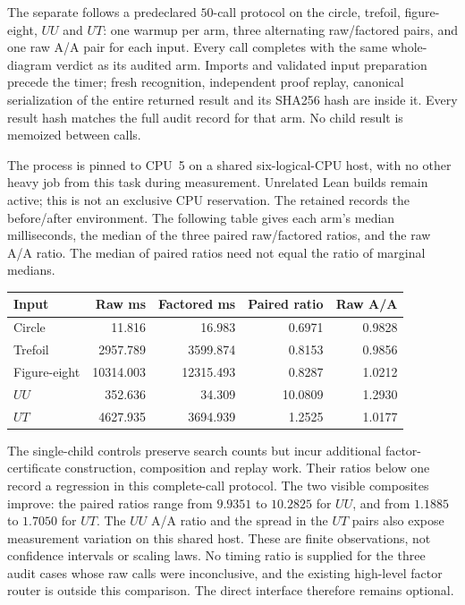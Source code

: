 The separate  follows a
predeclared $50$-call protocol on the circle, trefoil, figure-eight, $UU$
and $UT$: one warmup per arm, three alternating raw/factored pairs, and
one raw A/A pair for each input.  Every call completes with the same
whole-diagram verdict as its audited arm.  Imports and validated input
preparation precede the timer; fresh recognition, independent proof replay,
canonical serialization of the entire returned result and its SHA256 hash
are inside it.  Every result hash matches the full audit record for that
arm.  No child result is memoized between calls.

The process is pinned to CPU~5 on a shared six-logical-CPU host, with no
other heavy job from this task during measurement.  Unrelated Lean builds
remain active; this is not an exclusive CPU reservation.  The retained
 records the before/after
environment.  The following table gives each arm's median milliseconds,
the median of the three paired raw/factored ratios, and the raw A/A ratio.
The median of paired ratios need not equal the ratio of marginal medians.

\begin{center}\small
\begin{tabular}{lrrrr}
\toprule
Input & Raw ms & Factored ms & Paired ratio & Raw A/A\\
\midrule
Circle & 11.816 & 16.983 & 0.6971 & 0.9828\\
Trefoil & 2957.789 & 3599.874 & 0.8153 & 0.9856\\
Figure-eight & 10314.003 & 12315.493 & 0.8287 & 1.0212\\
$UU$ & 352.636 & 34.309 & 10.0809 & 1.2930\\
$UT$ & 4627.935 & 3694.939 & 1.2525 & 1.0177\\
\bottomrule
\end{tabular}
\end{center}

The single-child controls preserve search counts but incur additional
factor-certificate construction, composition and replay work.  Their
ratios below one record a regression in this complete-call protocol.
The two visible composites improve: the paired ratios range from
$9.9351$ to $10.2825$ for $UU$, and from $1.1885$ to $1.7050$ for $UT$.
The $UU$ A/A ratio and the spread in the $UT$ pairs also expose measurement
variation on this shared host.  These are finite observations, not
confidence intervals or scaling laws.  No timing ratio is supplied for
the three audit cases whose raw calls were inconclusive, and the existing
high-level factor router is outside this comparison.  The direct interface
therefore remains optional.

